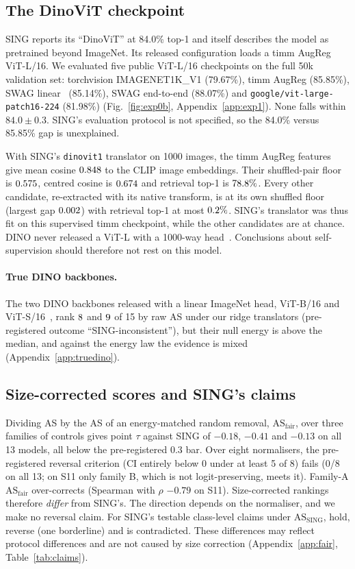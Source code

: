 \documentclass[10pt]{article}
\newcommand{\ASS}{\mathrm{AS}_{\mathrm{SING}}}
\newcommand{\ASF}{\mathrm{AS}_{\mathrm{fair}}}
\begin{document}
\subsection{The DinoViT checkpoint}
\label{sec:dino}
SING reports its ``DinoViT'' at 84.0\% top-1 and itself describes the model as pretrained beyond ImageNet.
Its released configuration loads a timm AugReg ViT-L/16.
We evaluated five public ViT-L/16 checkpoints on the full 50k validation set: torchvision IMAGENET1K\_V1 (79.67\%), timm AugReg (85.85\%), SWAG linear~\citep{swag2022} (85.14\%), SWAG end-to-end (88.07\%) and \texttt{google/vit-large-patch16-224} (81.98\%) (Fig.~\ref{fig:exp0b}, Appendix~\ref{app:exp1}).
None falls within $84.0\pm0.3$.
SING's evaluation protocol is not specified, so the 84.0\% versus 85.85\% gap is unexplained.

With SING's \texttt{dinovit1} translator on 1000 images, the timm AugReg features give mean cosine $0.848$ to the CLIP image embeddings.
Their shuffled-pair floor is $0.575$, centred cosine is $0.674$ and retrieval top-1 is $78.8\%$.
Every other candidate, re-extracted with its native transform, is at its own shuffled floor (largest gap $0.002$) with retrieval top-1 at most $0.2\%$.
SING's translator was thus fit on this supervised timm checkpoint, while the other candidates are at chance.
DINO never released a ViT-L with a 1000-way head~\citep{dino2021}.
Conclusions about self-supervision should therefore not rest on this model.


\paragraph{True DINO backbones.}
The two DINO backbones released with a linear ImageNet head, ViT-B/16 and ViT-S/16~\citep{dino2021}, rank $8$ and $9$ of 15 by raw AS under our ridge translators (pre-registered outcome ``SING-inconsistent''), but their null energy is above the median, and against the energy law the evidence is mixed (Appendix~\ref{app:truedino}).

\subsection{Size-corrected scores and SING's claims}
\label{sec:fair}
Dividing AS by the AS of an energy-matched random removal, $\ASF$, over three families of controls gives point $\tau$ against SING of $-0.18$, $-0.41$ and $-0.13$ on all 13 models, all below the pre-registered $0.3$ bar. Over eight normalisers, the pre-registered reversal criterion (CI entirely below 0 under at least 5 of 8) fails (0/8 on all 13; on S11 only family B, which is not logit-preserving, meets it). Family-A $\ASF$ over-corrects (Spearman with $\rho$ $-0.79$ on S11). Size-corrected rankings therefore \emph{differ} from SING's. The direction depends on the normaliser, and we make no reversal claim.
For SING's testable class-level claims under $\ASS$, \NTallyHolds{} hold, \NTallyRev{} reverse (one borderline) and \NTallyContra{} is contradicted. These differences may reflect protocol differences and are not caused by size correction (Appendix~\ref{app:fair}, Table~\ref{tab:claims}).
\end{document}
